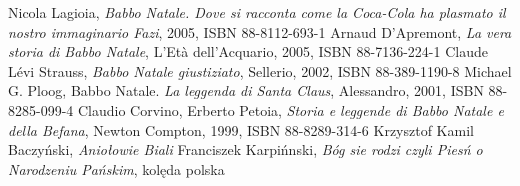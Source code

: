 \documentclass[oneside, fleqn]{book}
\begin{document}
\backmatter
\begin{thebibliography}{99}
 Nicola Lagioia, \emph{Babbo Natale. Dove si racconta come la Coca-Cola ha plasmato il nostro immaginario Fazi}, 2005, ISBN 88-8112-693-1
 Arnaud D'Apremont, \emph{La vera storia di Babbo Natale}, L'Età dell'Acquario, 2005, ISBN 88-7136-224-1
Claude Lévi Strauss, \emph{Babbo Natale giustiziato}, Sellerio, 2002, ISBN 88-389-1190-8
Michael G. Ploog, Babbo Natale. \emph{La leggenda di Santa Claus}, Alessandro, 2001, ISBN 88-8285-099-4
Claudio Corvino, Erberto Petoia, \emph{Storia e leggende di Babbo Natale e della Befana}, Newton Compton, 1999, ISBN 88-8289-314-6
Krzysztof Kamil Baczyński, \emph{Aniołowie Biali}
Franciszek Karpińnski, \emph{Bóg sie rodzi czyli Piesń o Narodzeniu Pańskim}, kolęda polska
\end{thebibliography}
\end{document}

